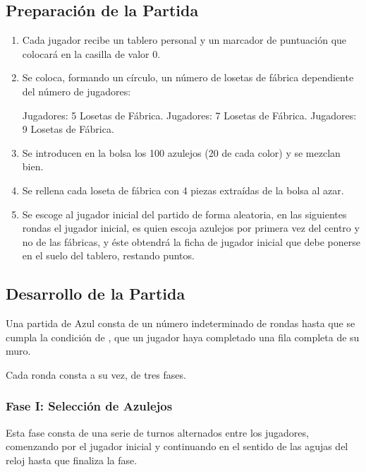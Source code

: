 \documentclass[a4paper,10pt,twocolumn]{article}
\begin{document}
\subsection{Preparación de la Partida}	

	\begin{enumerate}
		\item Cada jugador recibe un tablero personal y un marcador de puntuación que colocará en la casilla de valor 0.
		
		\item Se coloca, formando un círculo, un número de losetas de fábrica dependiente del número de jugadores:
				
		 Jugadores: 5 Losetas de Fábrica.
		 Jugadores: 7 Losetas de Fábrica.
		 Jugadores: 9 Losetas de Fábrica.
		
		\item Se introducen en la bolsa los 100 azulejos (20 de cada color) y se mezclan bien.
		
		\item 	Se rellena cada loseta de fábrica con 4 piezas extraídas de la bolsa al azar.
		
		\item	Se escoge al jugador inicial del partido de forma aleatoria, en las siguientes rondas el jugador inicial, es quien escoja azulejos por primera vez del centro y no de las fábricas, y éste obtendrá la ficha de jugador inicial que debe ponerse en el suelo del tablero, restando puntos.
	\end{enumerate}

\subsection{Desarrollo de la Partida}

	Una partida de Azul consta de un número indeterminado de rondas hasta que se cumpla la condición de  , que un jugador haya completado una fila completa de su muro.
	
	Cada ronda consta a su vez, de tres fases.
	
	\subsubsection{Fase I: Selección de Azulejos}
	
	Esta fase consta de una serie de turnos alternados entre los jugadores, comenzando por el jugador inicial y continuando en el sentido de las agujas del reloj hasta que finaliza la fase.
	
\end{document}

